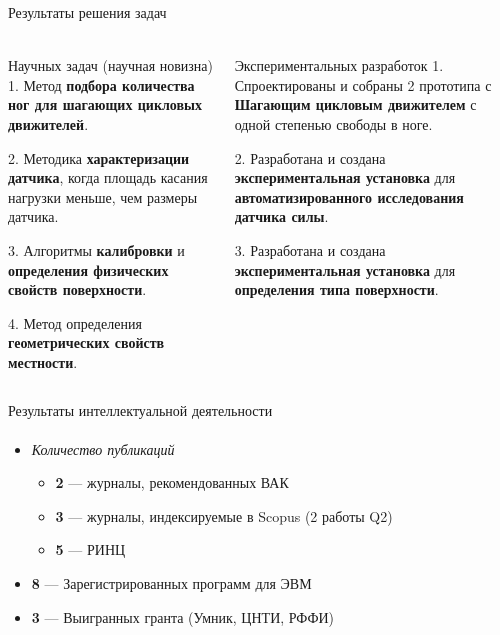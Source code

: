 \documentclass[aspectratio=169,xcolor=table,10pt]{beamer}
\begin{document}
\begin{frame}[t]{Результаты решения задач}
    \framesubtitle{}
    \begin{columns}[T,onlytextwidth]
        \begin{column}{0.48\textwidth}
            \begin{block}{Научных задач (научная новизна)}
                1. Метод \textbf{подбора количества ног для шагающих цикловых движителей}.

                2. Методика \textbf{характеризации датчика}, когда площадь касания нагрузки меньше, чем размеры датчика.

                3. Алгоритмы \textbf{калибровки} и \textbf{определения физических свойств поверхности}.

                4. Метод определения \textbf{геометрических свойств местности}.

            \end{block}
        \end{column}
        \begin{column}{0.48\textwidth}
            \begin{alertblock}{Экспериментальных разработок}
                1. Спроектированы и собраны 2 прототипа с \textbf{Шагающим цикловым движителем} с одной степенью свободы в ноге.

                2. Разработана и создана \textbf{экспериментальная установка} для \textbf{автоматизированного исследования датчика силы}.

                3. Разработана и создана \textbf{экспериментальная установка} для \textbf{определения типа поверхности}.

            \end{alertblock}
        \end{column}
    \end{columns}
\end{frame}

\begin{frame}[t]{Результаты интеллектуальной деятельности}
    \framesubtitle{}
    \begin{itemize}
        \item \textit{Количество публикаций}
              \begin{itemize}
                  \large
                  \item \textbf{2} --- журналы, рекомендованных ВАК
                  \item \textbf{3} --- журналы, индексируемые в Scopus (2 работы Q2)
                  \item \textbf{5} --- РИНЦ
              \end{itemize}
        \item \textbf{8} --- Зарегистрированных программ для ЭВМ
        \item \textbf{3} --- Выигранных гранта (Умник, ЦНТИ, РФФИ)
    \end{itemize}
\end{frame}
\end{document}
